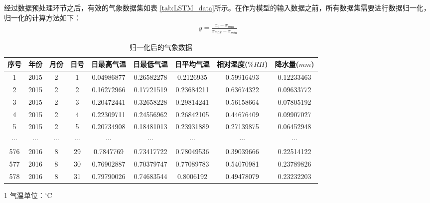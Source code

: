 经过数据预处理环节之后，有效的气象数据集如表 \ref{tab:LSTM_data}所示。在作为模型的输入数据之前，所有数据集需要进行数据归一化，归一化的计算方法如下：
\begin{align}
    y = \frac{x_i-x_{min}}{x_{max}-x_{min}}
\end{align}


\begin{table}[!ht]
    \caption{归一化后的气象数据}\label{tab:LSTM_data——normalization}
    \centering
    \resizebox{1.0\linewidth}{!}
    {\begin{threeparttable}          %
    \begin{tabular}{*9{c}}\toprule
        序号 & 年份 & 月份 & 日号 & 日最高气温\tnote{1} & 日最低气温\tnote{1} & 日平均气温\tnote{1}  & 相对湿度($\%RH$) & 降水量($mm$) \\ 
        \midrule
        1 & 2015 & 2 & 1 & 0.04986877 & 0.26582278 & 0.2126935 & 0.59916493 & 0.12233463 \\ 
        2 & 2015 & 2 & 2 & 0.16272966 & 0.17721519 & 0.23684211 & 0.63674322 & 0.09633772 \\ 
        3 & 2015 & 2 & 3 & 0.20472441 & 0.32658228 & 0.29814241 & 0.56158664 & 0.07805192 \\ 
        4 & 2015 & 2 & 4 & 0.22309711 & 0.24556962 & 0.26842105 & 0.44676409 & 0.09907027 \\ 
        5 & 2015 & 2 & 5 & 0.20734908 & 0.18481013 & 0.23931889 & 0.27139875 & 0.06452948 \\ 
        $\cdots$ & $\cdots$ & $\cdots$ & $\cdots$ & $\cdots$ & $\cdots$ & $\cdots$ & $\cdots$ & $\cdots$ \\ 
        576 & 2016 & 8 & 29 & 0.7847769 & 0.73417722 & 0.78049536 & 0.39039666 & 0.22514122 \\ 
        577 & 2016 & 8 & 30 & 0.76902887 & 0.70379747 & 0.77089783 & 0.54070981 & 0.23789826 \\ 
        578 & 2016 & 8 & 31 & 0.79790026 & 0.74683544  & 0.8006192 & 0.49478079 & 0.23232203 \\ 
        \bottomrule
    \end{tabular}
    \begin{tablenotes}    
        \small              
        \item[1] 气温单位：${}^{\circ}\text{C}$
    \end{tablenotes}          
    \end{threeparttable}}
    \vspace{-0.8em}
\end{table}

